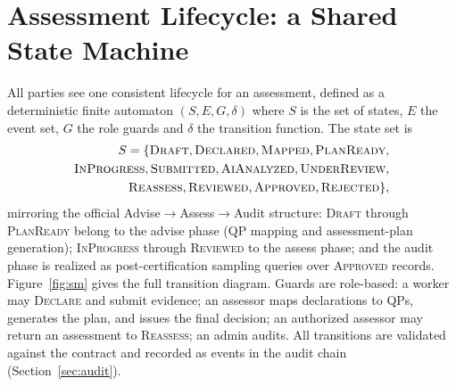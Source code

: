 \documentclass[conference]{IEEEtran}
\begin{document}
\section{Assessment Lifecycle: a Shared State Machine}
All parties see one consistent lifecycle for an assessment, defined as a deterministic
finite automaton $(S, E, G, \delta)$ where $S$ is the set of states, $E$ the event set,
$G$ the role guards and $\delta$ the transition function. The state set is
\begin{equation}
\begin{split}
S = \{ \textsc{Draft}, \textsc{Declared}, \textsc{Mapped}, \textsc{PlanReady},\\
\textsc{InProgress}, \textsc{Submitted}, \textsc{AiAnalyzed}, \textsc{UnderReview},\\
\textsc{Reassess}, \textsc{Reviewed}, \textsc{Approved}, \textsc{Rejected} \},
\end{split}
\label{eq:states}
\end{equation}
mirroring the official Advise$\rightarrow$Assess$\rightarrow$Audit structure: \textsc{Draft}
through \textsc{PlanReady} belong to the advise phase (QP mapping and assessment-plan
generation); \textsc{InProgress} through \textsc{Reviewed} to the assess phase; and the
audit phase is realized as post-certification sampling queries over \textsc{Approved}
records. Figure~\ref{fig:sm} gives the full transition diagram. Guards are role-based:
a worker may \textsc{Declare} and submit evidence; an assessor maps declarations to QPs,
generates the plan, and issues the final decision; an authorized assessor may return an
assessment to \textsc{Reassess}; an admin audits. All transitions are validated against the
contract and recorded as events in the audit chain (Section~\ref{sec:audit}).
\end{document}
